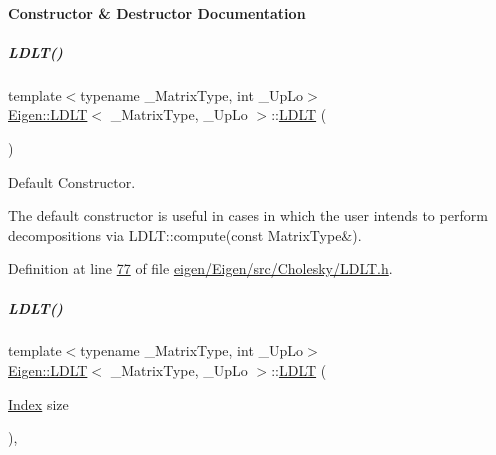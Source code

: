 \paragraph{Constructor \& Destructor Documentation}
\mbox{\label{group___cholesky___module_a2e06dedd2651649c5b251fbf9ba4e7d4}} 
\subparagraph{\texorpdfstring{L\+D\+L\+T()}{LDLT()}\hspace{0.1cm}{\footnotesize\ttfamily [1/8]}}
{\footnotesize\ttfamily template$<$typename \+\_\+\+Matrix\+Type, int \+\_\+\+Up\+Lo$>$ \\
\hyperlink{group___cholesky___module_class_eigen_1_1_l_d_l_t}{Eigen\+::\+L\+D\+LT}$<$ \+\_\+\+Matrix\+Type, \+\_\+\+Up\+Lo $>$\+::\hyperlink{group___cholesky___module_class_eigen_1_1_l_d_l_t}{L\+D\+LT} (\begin{DoxyParamCaption}{ }\end{DoxyParamCaption})\hspace{0.3cm}{\ttfamily [inline]}}



Default Constructor. 

The default constructor is useful in cases in which the user intends to perform decompositions via L\+D\+L\+T\+::compute(const Matrix\+Type\&). 

Definition at line \hyperlink{eigen_2_eigen_2src_2_cholesky_2_l_d_l_t_8h_source_l00077}{77} of file \hyperlink{eigen_2_eigen_2src_2_cholesky_2_l_d_l_t_8h_source}{eigen/\+Eigen/src/\+Cholesky/\+L\+D\+L\+T.\+h}.

\mbox{\label{group___cholesky___module_a154aa41bd2460199d48861eaf5e4f597}} 
\subparagraph{\texorpdfstring{L\+D\+L\+T()}{LDLT()}\hspace{0.1cm}{\footnotesize\ttfamily [2/8]}}
{\footnotesize\ttfamily template$<$typename \+\_\+\+Matrix\+Type, int \+\_\+\+Up\+Lo$>$ \\
\hyperlink{group___cholesky___module_class_eigen_1_1_l_d_l_t}{Eigen\+::\+L\+D\+LT}$<$ \+\_\+\+Matrix\+Type, \+\_\+\+Up\+Lo $>$\+::\hyperlink{group___cholesky___module_class_eigen_1_1_l_d_l_t}{L\+D\+LT} (\begin{DoxyParamCaption}\item[{\hyperlink{group___cholesky___module_ad9c57eb2fb3bbccd51b9d2e111bea355}{Index}}]{size }\end{DoxyParamCaption})\hspace{0.3cm}{\ttfamily [inline]}, {\ttfamily [explicit]}}



